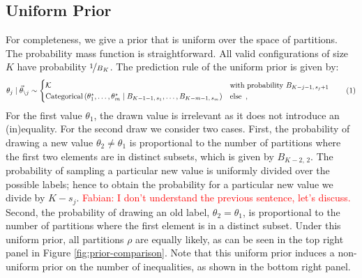\documentclass[11pt,a4paper]{article}
\theoremstyle{definition} %
\theoremstyle{case}
\newcommand{\bellnum}[1]{B_{#1}}
\newcommand{\rbellnum}[2]{B_{#1,\,#2}}
\newcommand{\numberthis}{\addtocounter{equation}{1}\tag{\theequation}}
\newcommand{\FD}[1]{\textcolor{red}{Fabian: #1 }}
\begin{document}
\subsection{Uniform Prior}
For completeness, we give a prior that is uniform over the space of partitions. The probability mass function is straightforward. All valid configurations of size $K$ have probability $\nicefrac{1}{\bellnum{K}}$. The prediction rule of the uniform prior is given by:
\begin{equation}
    \theta_j \mid \vec{\theta}_{\backslash j}%
    \sim \begin{cases}
    \mathcal{K} & \text{with probability } \rbellnum{K - j - 1}{s_j + 1} \\
    \text{Categorical}\left(\theta_1^{\star}, \ldots, \theta_m^{\star} \mid \rbellnum{K - 1 - 1}{s_1}, \ldots, \rbellnum{K - m - 1}{s_m}\right) & \text{else} \enspace ,
    \end{cases} \numberthis
\end{equation}
For the first value $\theta_1$, the drawn value is irrelevant as it does not introduce an (in)equality. For the second draw we consider two cases. First, the probability of drawing a new value $\theta_2 \neq \theta_1$ is proportional to the number of partitions where the first two elements are in distinct subsets, which is given by $\rbellnum{K - 2}{2}$. The probability of sampling a particular new value is uniformly divided over the possible labels; hence to obtain the probability for a particular new value we divide by $K - s_j$. \FD{I don't understand the previous sentence, let's discuss.} Second, the probability of drawing an old label, $\theta_2 = \theta_1$, is proportional to the number of partitions where the first element is in a distinct subset. Under this uniform prior, all partitions $\rho$ are equally likely, as can be seen in the top right panel in Figure \ref{fig:prior-comparison}. Note that this uniform prior induces a non-uniform prior on the number of inequalities, as shown in the bottom right panel.
\end{document}

